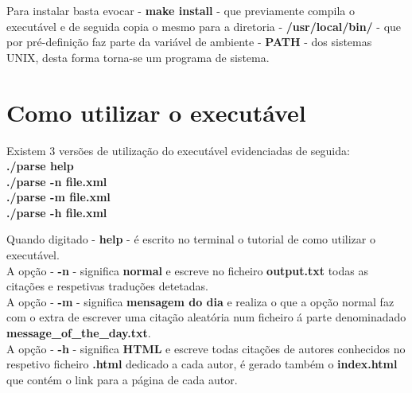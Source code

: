 \documentclass[11pt,a4paper]{report}%
\begin{document}
Para instalar basta evocar - \textbf{make install} - que previamente compila o executável e de seguida copia o mesmo para a diretoria - \textbf{/usr/local/bin/} -
que por pré-definição faz parte da variável de ambiente - \textbf{PATH} - dos sistemas UNIX, desta forma torna-se um programa de sistema.

\section{Como utilizar o executável}

Existem 3 versões de utilização do executável evidenciadas de seguida:\\
 
\textbf{./parse help\\
./parse -n file.xml\\
./parse -m file.xml\\
./parse -h file.xml\\}

Quando digitado - \textbf{help} - é escrito no terminal o tutorial de como utilizar o executável.\\

A opção - \textbf{-n} - significa \textbf{normal} e escreve no ficheiro \textbf{output.txt} todas as citações e respetivas traduções detetadas.\\

A opção - \textbf{-m} - significa \textbf{mensagem do dia} e realiza o que a opção normal faz com o extra de escrever uma citação aleatória num ficheiro á parte denominadado \textbf{message\_of\_the\_day.txt}.\\

A opção - \textbf{-h} - significa \textbf{HTML} e escreve todas citações de autores conhecidos no respetivo ficheiro \textbf{.html} dedicado a cada autor, é gerado também o \textbf{index.html} que contém o link para a página de cada autor.

\end{document}
